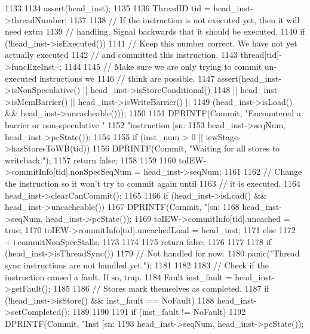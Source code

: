 \begin{DoxyCode}
1133 {
1134     assert(head_inst);
1135 
1136     ThreadID tid = head_inst->threadNumber;
1137 
1138     // If the instruction is not executed yet, then it will need extra
1139     // handling.  Signal backwards that it should be executed.
1140     if (!head_inst->isExecuted()) {
1141         // Keep this number correct.  We have not yet actually executed
1142         // and committed this instruction.
1143         thread[tid]->funcExeInst--;
1144 
1145         // Make sure we are only trying to commit un-executed instructions we
1146         // think are possible.
1147         assert(head_inst->isNonSpeculative() || head_inst->isStoreConditional()
1148                || head_inst->isMemBarrier() || head_inst->isWriteBarrier() ||
1149                (head_inst->isLoad() && head_inst->uncacheable()));
1150 
1151         DPRINTF(Commit, "Encountered a barrier or non-speculative "
1152                 "instruction [sn:%
1153                 head_inst->seqNum, head_inst->pcState());
1154 
1155         if (inst_num > 0 || iewStage->hasStoresToWB(tid)) {
1156             DPRINTF(Commit, "Waiting for all stores to writeback.\n");
1157             return false;
1158         }
1159 
1160         toIEW->commitInfo[tid].nonSpecSeqNum = head_inst->seqNum;
1161 
1162         // Change the instruction so it won't try to commit again until
1163         // it is executed.
1164         head_inst->clearCanCommit();
1165 
1166         if (head_inst->isLoad() && head_inst->uncacheable()) {
1167             DPRINTF(Commit, "[sn:%
1168                     head_inst->seqNum, head_inst->pcState());
1169             toIEW->commitInfo[tid].uncached = true;
1170             toIEW->commitInfo[tid].uncachedLoad = head_inst;
1171         } else {
1172             ++commitNonSpecStalls;
1173         }
1174 
1175         return false;
1176     }
1177 
1178     if (head_inst->isThreadSync()) {
1179         // Not handled for now.
1180         panic("Thread sync instructions are not handled yet.\n");
1181     }
1182 
1183     // Check if the instruction caused a fault.  If so, trap.
1184     Fault inst_fault = head_inst->getFault();
1185 
1186     // Stores mark themselves as completed.
1187     if (!head_inst->isStore() && inst_fault == NoFault) {
1188         head_inst->setCompleted();
1189     }
1190 
1191     if (inst_fault != NoFault) {
1192         DPRINTF(Commit, "Inst [sn:%
1193                 head_inst->seqNum, head_inst->pcState());
}}
\end{DoxyCode}
